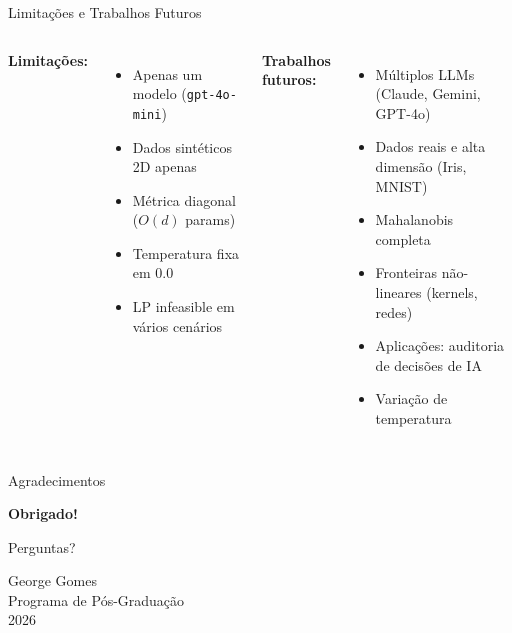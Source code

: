 \documentclass[aspectratio=169,12pt]{beamer}
\begin{document}
\begin{frame}{Limitações e Trabalhos Futuros}
\begin{columns}
\textbf{Limitações:}
\begin{itemize}
    \item Apenas um modelo (\texttt{gpt-4o-mini})
    \item Dados sintéticos 2D apenas
    \item Métrica diagonal ($O(d)$ params)
    \item Temperatura fixa em 0.0
    \item LP infeasible em vários cenários
\end{itemize}

\textbf{Trabalhos futuros:}
\begin{itemize}
    \item Múltiplos LLMs (Claude, Gemini, GPT-4o)
    \item Dados reais e alta dimensão (Iris, MNIST)
    \item Mahalanobis completa
    \item Fronteiras não-lineares (kernels, redes)
    \item Aplicações: auditoria de decisões de IA
    \item Variação de temperatura
\end{itemize}
\end{columns}
\end{frame}

\begin{frame}{Agradecimentos}
\begin{center}
\vspace{1cm}
{\Large \textbf{Obrigado!}}

\vspace{1.5cm}
{\large Perguntas?}

\vspace{1.5cm}
\small
George Gomes\\
Programa de Pós-Graduação\\
2026
\end{center}
\end{frame}
\end{document}
